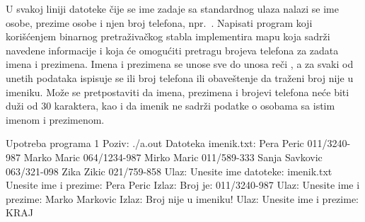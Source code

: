 \begin{Exercise}[label=704]
U svakoj liniji datoteke čije se ime zadaje sa standardnog ulaza nalazi se ime osobe, prezime osobe i njen broj telefona, npr.~. Napisati program koji korišćenjem binarnog pretraživačkog stabla implementira mapu koja sadrži navedene informacije i koja će omogućiti pretragu brojeva telefona za zadata imena i prezimena. Imena i prezimena se unose sve do unosa reči , a za svaki od unetih podataka ispisuje se ili broj telefona ili obaveštenje da traženi broj nije u imeniku. Može se pretpostaviti da imena, prezimena i brojevi telefona neće biti duži od $30$ karaktera, kao i da imenik ne sadrži podatke o osobama sa istim imenom i prezimenom.

\begin{maxitest}
\begin{test}{Upotreba programa 1}
Poziv: ./a.out 
Datoteka imenik.txt:
   Pera Peric 011/3240-987
   Marko Maric 064/1234-987
   Mirko Maric 011/589-333
   Sanja Savkovic 063/321-098
   Zika Zikic 021/759-858
Ulaz:
	Unesite ime datoteke: imenik.txt
	Unesite ime i prezime: Pera Peric
Izlaz:	
	Broj je: 011/3240-987
Ulaz:	
	Unesite ime i prezime: Marko Markovic
Izlaz:
	Broj nije u imeniku!
Ulaz:	
	Unesite ime i prezime: KRAJ
\end{test}
\end{maxitest}
\end{Exercise}

\begin{Answer}[ref=704]
\end{Answer}


